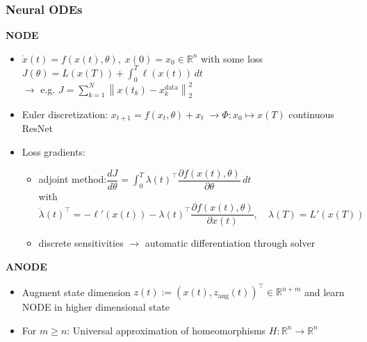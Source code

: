 \documentclass[11pt,aspectratio=169]{beamer}
\newcommand{\norm}[1]{\left\lVert#1\right\rVert}
\newcommand{\R}{\mathbb{R}}
\begin{document}
\begin{frame}[t]
    \frametitle{Neural ODEs}
    \textbf{NODE}\\
    \begin{itemize}
        \item $\dot{x}(t) = f(x(t), \theta), \; x(0)=x_0\in \R^n$\; with some loss $J(\theta) = L(x(T)) + \int_0^T \ell(x(t))\,dt$\\
        $\to$ e.g. $J = \sum_{k=1}^N \norm{x(t_k)-x_k^{\text{data}}}_2^2$
        \item Euler discretization:\; $x_{t+1} = f(x_t, \theta) + x_t \;\to \Phi:x_0\mapsto x(T)$  continuous ResNet
        \item Loss gradients:
            \begin{itemize}
                \item adjoint method:\quad $\dfrac{dJ}{d\theta} = \int_{0}^{T} \lambda(t)^\top \dfrac{\partial f(x(t),\theta)}{\partial \theta}\,dt$\\\vspace{0.1cm}
                with $\dot{\lambda}(t)^\top = -\ell'(x(t)) - \lambda(t)^\top \dfrac{\partial f(x(t),\theta)}{\partial x(t)},\quad \lambda(T)=L'(x(T))$\vspace{0.1cm}
                
                \item discrete sensitivities $\to$ automatic differentiation through solver
            \end{itemize}
     \end{itemize}
     \textbf{ANODE}\\
     \begin{itemize}
         \item Augment state dimension $z(t):=\left(x(t),z_{\text{aug}}(t)\right)^\top\in\R^{n+m}$ and learn NODE in higher dimensional state
         \item For $m\geq n$: Universal approximation of homeomorphisms $H:\R^n\to \R^n$
     \end{itemize}
\end{frame}


\end{document}
